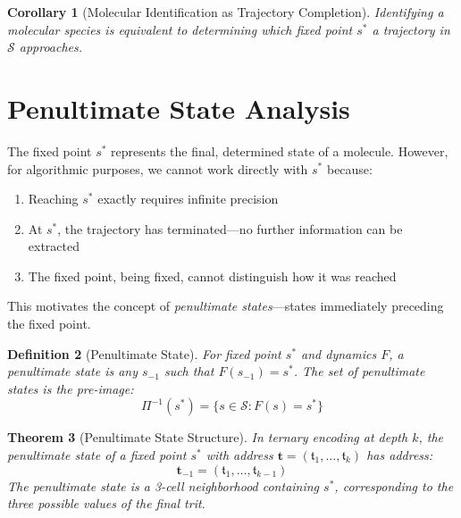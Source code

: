 \documentclass[twocolumn,10pt,a4paper]{article}
\newtheorem{theorem}{Theorem}[section]
\newtheorem{corollary}[theorem]{Corollary}
\newtheorem{definition}[theorem]{Definition}
\newcommand{\Sspace}{\mathcal{S}}
\newcommand{\trit}{\mathfrak{t}}
\begin{document}
\begin{corollary}[Molecular Identification as Trajectory Completion]
Identifying a molecular species is equivalent to determining which fixed point $s^*$ a trajectory in $\Sspace$ approaches.
\end{corollary}

\section{Penultimate State Analysis}
\label{sec:penultimate}

The fixed point $s^*$ represents the final, determined state of a molecule. However, for algorithmic purposes, we cannot work directly with $s^*$ because:

\begin{enumerate}[label=(\roman*)]
    \item Reaching $s^*$ exactly requires infinite precision
    \item At $s^*$, the trajectory has terminated---no further information can be extracted
    \item The fixed point, being fixed, cannot distinguish how it was reached
\end{enumerate}

This motivates the concept of \emph{penultimate states}---states immediately preceding the fixed point.

\begin{definition}[Penultimate State]
\label{def:penultimate}
For fixed point $s^*$ and dynamics $F$, a \emph{penultimate state} is any $s_{-1}$ such that $F(s_{-1}) = s^*$. The set of penultimate states is the \emph{pre-image}:
\begin{equation}
\Pi^{-1}(s^*) = \{s \in \Sspace : F(s) = s^*\}
\end{equation}
\end{definition}

\begin{theorem}[Penultimate State Structure]
\label{thm:penultimate}
In ternary encoding at depth $k$, the penultimate state of a fixed point $s^*$ with address $\mathbf{t} = (\trit_1, \ldots, \trit_k)$ has address:
\begin{equation}
\mathbf{t}_{-1} = (\trit_1, \ldots, \trit_{k-1})
\end{equation}
The penultimate state is a 3-cell neighborhood containing $s^*$, corresponding to the three possible values of the final trit.
\end{theorem}
\end{document}
